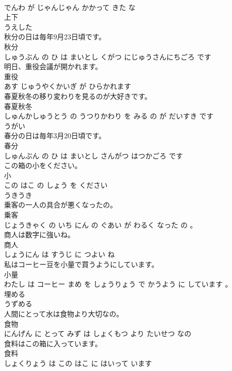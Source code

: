 \documentclass[8pt]{extreport}
\begin{document}
\begin{CJK}{UTF8}{min}
\\	でんわ が じゃんじゃん かかって きた な			
\\	上下	
\\	うえした			
\\	秋分の日は毎年9月23日頃です。	
\\	秋分 
\\	しゅうぶん の ひ は まいとし くがつ にじゅうさんにちごろ です			
\\	明日、重役会議が開かれます。	
\\	重役 
\\	あす じゅうやくかいぎ が ひらかれます			
\\	春夏秋冬の移り変わりを見るのが大好きです。	
\\	春夏秋冬 
\\	しゅんかしゅうとう の うつりかわり を みる の が だいすき です			
\\	うがい	
\\	春分の日は毎年3月20日頃です。	
\\	春分 
\\	しゅんぶん の ひ は まいとし さんがつ はつかごろ です			
\\	この箱の小をください。	
\\	小 
\\	この はこ の しょう を ください			
\\	うきうき	
\\	乗客の一人の具合が悪くなったの。	
\\	乗客 
\\	じょうきゃく の いち にん の ぐあい が わるく なった の 。			
\\	商人は数字に強いね。	
\\	商人 
\\	しょうにん は すうじ に つよい ね			
\\	私はコーヒー豆を小量で買うようにしています。	
\\	小量 
\\	わたし は コーヒー まめ を しょうりょう で かうよう に しています 。			
\\	埋める	
\\	うずめる			
\\	人間にとって水は食物より大切なの。	
\\	食物 
\\	にんげん に とって みず は しょくもつ より たいせつ なの			
\\	食料はこの箱に入っています。	
\\	食料 
\\	しょくりょう は この はこ に はいって います			

\end{CJK}
\end{document}
